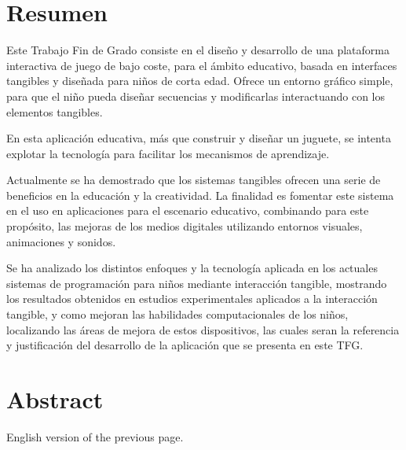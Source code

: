 \chapter{Resumen}
Este Trabajo Fin de Grado consiste en el diseño y desarrollo de una plataforma
interactiva de juego de bajo coste, para el ámbito educativo, basada en
interfaces tangibles y diseñada para niños de corta edad. Ofrece un entorno
gráfico simple, para que el niño pueda diseñar secuencias y modificarlas
interactuando con los elementos tangibles.

En esta aplicación educativa, más que construir y diseñar un juguete, se intenta
explotar la tecnología para facilitar los mecanismos de aprendizaje.

Actualmente se ha demostrado que los sistemas tangibles ofrecen una serie de
beneficios en la educación y la creatividad. La finalidad es fomentar este
sistema en el uso en aplicaciones para el escenario educativo, combinando para
este propósito, las mejoras de los medios digitales utilizando entornos
visuales, animaciones y sonidos.

Se ha analizado los distintos enfoques y la tecnología aplicada en los actuales
sistemas de programación para niños mediante interacción tangible, mostrando los
resultados obtenidos en estudios experimentales aplicados a la interacción
tangible, y como mejoran las habilidades computacionales de los niños,
localizando las áreas de mejora de estos dispositivos, las cuales seran la
referencia y justificación del desarrollo de la aplicación que se presenta en
este TFG.



\chapter{Abstract}

English version of the previous page.

